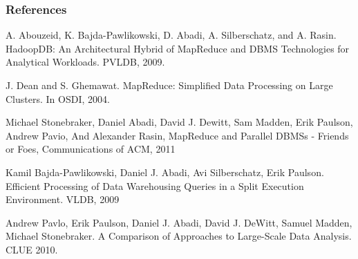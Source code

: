 \documentclass{beamer}
\begin{document}

\begin{frame}
  \frametitle{References}
  \begin{enumerate}
{\small{
  \item A. Abouzeid, K. Bajda-Pawlikowski, D. Abadi, A. Silberschatz, and A. Rasin. HadoopDB: An Architectural Hybrid of MapReduce and
    DBMS Technologies for Analytical Workloads. PVLDB, 2009.
  \item J. Dean and S. Ghemawat. MapReduce: Simplified Data Processing
    on Large Clusters. In OSDI, 2004.
  \item Michael Stonebraker, Daniel Abadi, David J. Dewitt, Sam Madden,
    Erik Paulson, Andrew Pavio, And Alexander Rasin, MapReduce and
    Parallel DBMSs -  Friends or Foes, Communications of ACM, 2011
    \item Kamil Bajda-Pawlikowski, Daniel J. Abadi, Avi Silberschatz,
      Erik Paulson. Efficient Processing of Data Warehousing Queries
      in a Split Execution Environment. VLDB, 2009
      \item Andrew Pavlo, 
Erik Paulson, Daniel J. Abadi, David J. DeWitt, Samuel Madden, Michael
Stonebraker. A Comparison of Approaches to Large-Scale Data
Analysis. CLUE 2010.}}
  \end{enumerate}
\end{frame}

\end{document}
